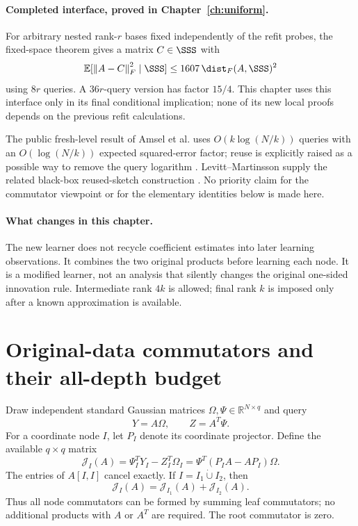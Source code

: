 \documentclass[11pt,oneside,openany,a4paper]{book}
\numberwithin{equation}{chapter}
\theoremstyle{definition}
\theoremstyle{remark}
\newcommand{\R}{\mathbb R}\newcommand{\E}{\mathbb E}\newcommand{\Prb}{\mathbb P}\newcommand{\PP}{\mathbb P}
\newcommand{\F}[1]{\left\lVert#1\right\rVert_F}
\newcommand{\J}{\mathcal J}\newcommand{\transpose}{\mathsf T}
\begin{document}
\paragraph{Completed interface, proved in Chapter~\ref{ch:uniform}.}
For arbitrary nested rank-$r$ bases fixed independently of the refit probes, the fixed-space theorem gives a matrix $C\in\SSS$ with
\begin{equation}\label{comm:eq:refit}
 \E[\F{A-C}^2\mid\SSS]\le1607\,\dist_F(A,\SSS)^2
\end{equation}
using $8r$ queries. A $36r$-query version has factor $15/4$. This chapter uses this interface only in its final conditional implication; none of its new local proofs depends on the previous refit calculations.

The public fresh-level result of Amsel et al. uses $O(k\log(N/k))$ queries with an $O(\log(N/k))$ expected squared-error factor; reuse is explicitly raised as a possible way to remove the query logarithm \cite{AmselHSS}. Levitt--Martinsson supply the related black-box reused-sketch construction \cite{LM}. No priority claim for the commutator viewpoint or for the elementary identities below is made here.

\paragraph{What changes in this chapter.}
The new learner does not recycle coefficient estimates into later learning observations. It combines the two original products before learning each node. It is a modified learner, not an analysis that silently changes the original one-sided innovation rule. Intermediate rank $4k$ is allowed; final rank $k$ is imposed only after a known approximation is available.

\section{Original-data commutators and their all-depth budget}
Draw independent standard Gaussian matrices $\Omega,\Psi\in\R^{N\times q}$ and query
\[
 Y=A\Omega,\qquad Z=A^T\Psi.
\]
For a coordinate node $I$, let $P_I$ denote its coordinate projector. Define the available $q\times q$ matrix
\begin{equation}\label{comm:eq:J}
 \boxed{\J_I(A)=\Psi_I^T Y_I-Z_I^T\Omega_I
       =\Psi^T(P_IA-AP_I)\Omega.}
\end{equation}
The entries of $A[I,I]$ cancel exactly. If $I=I_1\dot\cup I_2$, then
\begin{equation}\label{comm:eq:add}
 \J_I(A)=\J_{I_1}(A)+\J_{I_2}(A).
\end{equation}
Thus all node commutators can be formed by summing leaf commutators; no additional products with $A$ or $A^T$ are required. The root commutator is zero.
\end{document}
